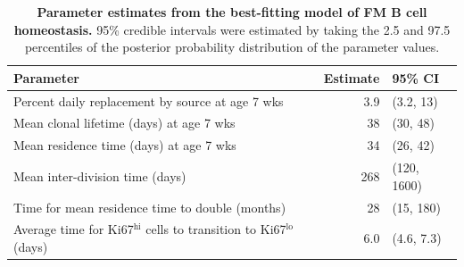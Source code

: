 \documentclass[11pt]{article}
\newcommand{\khi}{Ki67$^\text{hi}$}
\newcommand{\klo}{Ki67$^\text{lo}$}
\begin{document}
	\begin{table}[htbp]
		\begin{center}
			\renewcommand{\arraystretch}{1.25}
			\begin{tabular}{ l r l } 
				\toprule 
				\textbf{Parameter}  &  \textbf{Estimate}  &  \textbf{95\%  CI} \\ 
				\toprule
				Percent daily replacement by source at age 7 wks          & 3.9      &  (3.2, 13)  \\
				Mean clonal lifetime (days) at age 7 wks                  & 38       &  (30, 48)  \\
				Mean residence time (days) at age 7 wks                   & 34       &  (26, 42)  \\ 
				Mean inter-division time (days)                           & 268      &  (120, 1600)  \\
				Time for mean residence time to double (months)           & 28       &  (15, 180)  \\
				Average time for {\khi} cells to transition to {\klo} (days)            & 6.0      &  (4.6, 7.3)  \\
				\hline
				\toprule 
			\end{tabular}
		\end{center}
		\caption{\textbf{Parameter estimates from the best-fitting model of FM B cell homeostasis.} 95\% credible intervals were estimated by taking the 2.5 and 97.5 percentiles of the posterior probability distribution of the parameter values.}
		\label{tab:FM-pars}
	\end{table} 


	

	
	
\end{document}

